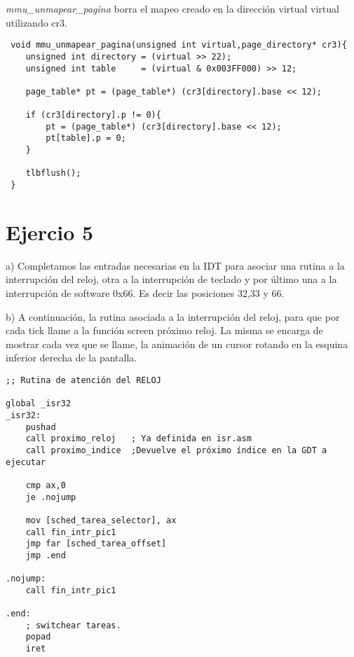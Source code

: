 \documentclass[a4paper]{article}
\begin{document}
\textit{mmu_unmapear_pagina }  borra el mapeo creado en la direcci\'on virtual virtual utilizando cr3. \\


\begin{codesnippet}
\begin{verbatim}
 void mmu_unmapear_pagina(unsigned int virtual,page_directory* cr3){
 	unsigned int directory = (virtual >> 22);
    unsigned int table     = (virtual & 0x003FF000) >> 12;

    page_table* pt = (page_table*) (cr3[directory].base << 12);

    if (cr3[directory].p != 0){
        pt = (page_table*) (cr3[directory].base << 12);
        pt[table].p = 0;
    }

    tlbflush();
 }
\end{verbatim}
\end{codesnippet}

\newpage
\section{Ejercio 5}

{\large a)} Completamos las entradas necesarias en la IDT para asociar una rutina a la interrupci\'on del
reloj, otra a la interrupci\'on de teclado y por \'ultimo una a la interrupci\'on de software 0x66. Es decir las posiciones 32,33 y 66.


{\large b)} A continuación, la rutina asociada a la interrupci\'on del reloj, para que por cada tick llame a la
funci\'on screen pr\'oximo reloj. La misma se encarga de mostrar cada vez que se llame, la
animaci\'on de un cursor rotando en la esquina inferior derecha de la pantalla. 

\begin{codesnippet}
\begin{verbatim}
;; Rutina de atención del RELOJ

global _isr32
_isr32:
    pushad
    call proximo_reloj 	 ; Ya definida en isr.asm
    call proximo_indice  ;Devuelve el próximo índice en la GDT a ejecutar

    cmp ax,0
    je .nojump

    mov [sched_tarea_selector], ax
    call fin_intr_pic1
    jmp far [sched_tarea_offset]
    jmp .end

.nojump:
    call fin_intr_pic1

.end:
    ; switchear tareas.
    popad
    iret
\end{verbatim}
\end{codesnippet}
\end{document}
